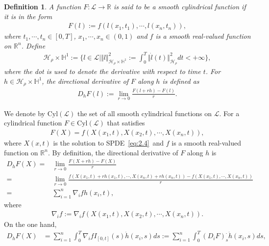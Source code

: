 \documentclass[11pt]{article}
\numberwithin{equation}{section}%
\numberwithin{figure}{section}%
\newtheorem{definition}[theorem]{Definition}
\theoremstyle{remark}
\begin{document}
		\begin{definition} 
		 A function $F:\mathcal{L}\rightarrow\mathbb{R}$ is said to be a smooth cylindrical function if it is in the form
		\begin{align}\label{eq:cylfun}
			F(l):=f(l(x_{1},t_{1}),\cdots,l(x_{n},t_{n})),
		\end{align}
		where $t_{1},\cdots,t_{n}\in [0,T]$, $x_{1},\cdots,x_{n}\in (0,1)$ and $f$ is a smooth real-valued function on $\mathbb{R}^{n}$. Define
		\begin{align*}
			\mathcal{H}_{\rho}\times \mathbb{H}^{1}:=\{l\in\mathcal{L}\mid \Vert l\Vert^{2}_{\mathcal{H}_{\rho}\times \mathbb{H}^{1}}:= \int_{0}^{T}\Vert\dot{l}(t)\Vert^{2}_{\mathcal{H}_{\rho}}dt<+\infty\},
		\end{align*}
		where the dot is used to denote the derivative with respect to time $t$.
		 For $h\in \mathcal{H}_{\rho}\times \mathbb{H}^{1}$, the directional derivative of $F$ along $h$ is defined as 
		\begin{align*}
			D_{h}F(l):=\lim_{r\rightarrow 0}\frac{F(l+rh)-F(l)}{r}.
		\end{align*}
	\end{definition} 
	We denote by $\text{Cyl}(\mathcal{L})$ the set of all smooth cylindrical functions on $ \mathcal{L}$. For a cylindrical function $F\in \text{Cyl}(\mathcal{L})$ that satisfies
	\begin{align*} F(X)=f(X(x_{1},t),X(x_{2},t),\cdots ,X(x_{n},t)),
	\end{align*}
	where $X(x,t)$ is the solution to SPDE~\eqref{eq:2.4}~and $f$ is a smooth real-valued function on $\mathbb{R}^{n}$. By definition, the directional derivative of $F$ along $h$ is
	\begin{align*}
		D_{h}F(X)=&\lim_{r\rightarrow 0}\frac{F(X+rh)-F(X)}{r}\\
		=&\lim_{r\rightarrow 0}\frac{f(X(x_{1},t)+rh(x_{1},t),\cdots ,X(x_{n},t)+rh(x_{n},t))-f(X(x_{1},t),\cdots ,X(x_{n},t))}{r}\\
		=&\sum_{i=1}^{n}\nabla_{i}fh(x_{i},t),
	\end{align*}
	where 
	\begin{align*}
		\nabla_{i}f:=\nabla_{i}f(X(x_{1},t),X(x_{2},t),\cdots ,X(x_{n},t)).
	\end{align*}
 On the one hand, 
	\begin{align*}
		D_{h}F(X)&=\sum_{i=1}^{n}\int_{0}^{T}\nabla_{i}fI_{[0,t]}(s)\dot{h}(x_{i},s)ds:=\sum_{i=1}^{n}\int_{0}^{T}(D_{i}F)_{s}^{\cdot}\dot{h}(x_{i},s)ds,
	\end{align*}
\end{document}
